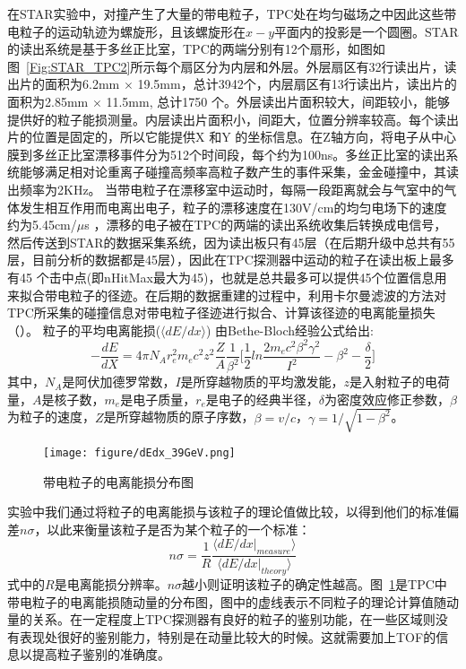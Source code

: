 在STAR实验中，对撞产生了大量的带电粒子，TPC处在均匀磁场之中因此这些带电粒子的运动轨迹为螺旋形，且该螺旋形在$x-y$平面内的投影是一个圆圈。STAR的读出系统是基于多丝正比室\cite{anderson2003star}，TPC的两端分别有12个扇形，如图如图~\ref{Fig:STAR_TPC2}所示每个扇区分为内层和外层。外层扇区有32行读出片，读出片的面积为6.2mm $\times$ 19.5mm，总计3942个，内层扇区有13行读出片，读出片的面积为2.85mm $\times$ 11.5mm, 总计1750 个。外层读出片面积较大，间距较小，能够提供好的粒子能损测量。内层读出片面积小，间距大，位置分辨率较高。每个读出片的位置是固定的，所以它能提供X 和Y 的坐标信息。在Z轴方向，将电子从中心膜到多丝正比室漂移事件分为512个时间段，每个约为100ns。多丝正比室的读出系统能够满足相对论重离子碰撞高频率高粒子数产生的事件采集，金金碰撞中，其读出频率为2KHz。
当带电粒子在漂移室中运动时，每隔一段距离就会与气室中的气体发生相互作用而电离出电子，粒子的漂移速度在130V/cm的均匀电场下的速度约为5.45cm/$\mu$s ，漂移的电子被在TPC的两端的读出系统收集后转换成电信号，然后传送到STAR的数据采集系统，因为读出板只有45层（在后期升级中总共有55层，目前分析的数据都是45层），因此在TPC探测器中运动的粒子在读出板上最多有45 个击中点(即nHitMax最大为45)，也就是总共最多可以提供45个位置信息用来拟合带电粒子的径迹。在后期的数据重建的过程中，利用卡尔曼滤波的方法对TPC所采集的碰撞信息对带电粒子径迹进行拟合、计算该径迹的电离能量损失（\dEdx ）。
粒子的平均电离能损($\langle dE/dx \rangle$) 由Bethe-Bloch经验公式给出:
\begin{equation}
\label{eq:bethe_bloch}
-\frac{dE}{dX} = 4\pi N_{A}r_{e}^{2}m_{e}c^{2}z^{2}\frac{Z}{A}\frac{1}{\beta^{2}}\big[\frac{1}{2}ln\frac{2m_{e}c^{2}\beta^{2}\gamma^{2}}{I^{2}} - \beta^{2} - \frac{\delta}{2} \big]
\end{equation}
其中，$N_{A}$是阿伏加德罗常数，$I$是所穿越物质的平均激发能，$z$是入射粒子的电荷量，$A$是核子数，$m_{e}$是电子质量，$r_{e}$是电子的经典半径，$\delta$为密度效应修正参数，$\beta$为粒子的速度，$Z$是所穿越物质的原子序数，$\beta = v/c$，$\gamma = 1/\sqrt{1-\beta^{2}}$。
\begin{figure}[htbp]
\centering
\texttt{[image: figure/dEdx\_39GeV.png]}
\caption{带电粒子的电离能损分布图}
\label{fig:tpc_dedx}
\end{figure}
实验中我们通过将粒子的电离能损与该粒子的理论值做比较，以得到他们的标准偏差$n\sigma$，以此来衡量该粒子是否为某个粒子的一个标准：
\begin{equation}
n\sigma = \frac{1}{R} \frac{\langle dE/dx|_{measure} \rangle}{\langle dE/dx|_{theory} \rangle}
\label{eq:nsigma}
\end{equation}
式中的$R$是电离能损分辨率。$n\sigma$越小则证明该粒子的确定性越高。图~\ref{fig:tpc_dedx}是TPC中带电粒子的电离能损随动量的分布图，图中的虚线表示不同粒子的理论计算值随动量的关系。在一定程度上TPC探测器有良好的粒子的鉴别功能，在一些区域则没有表现处很好的鉴别能力，特别是在动量比较大的时候。这就需要加上TOF的信息以提高粒子鉴别的准确度。


